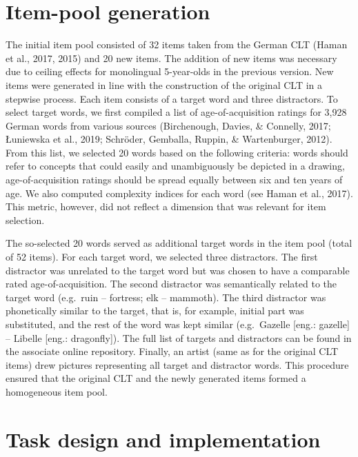 \documentclass[
  man,floatsintext]{apa6}
\begin{document}
\hypertarget{item-pool-generation}{%
\section{Item-pool generation}\label{item-pool-generation}}

The initial item pool consisted of 32 items taken from the German CLT (Haman et al., 2017, 2015) and 20 new items. The addition of new items was necessary due to ceiling effects for monolingual 5-year-olds in the previous version. New items were generated in line with the construction of the original CLT in a stepwise process. Each item consists of a target word and three distractors. To select target words, we first compiled a list of age-of-acquisition ratings for 3,928 German words from various sources (Birchenough, Davies, \& Connelly, 2017; Łuniewska et al., 2019; Schröder, Gemballa, Ruppin, \& Wartenburger, 2012). From this list, we selected 20 words based on the following criteria: words should refer to concepts that could easily and unambiguously be depicted in a drawing, age-of-acquisition ratings should be spread equally between six and ten years of age. We also computed complexity indices for each word (see Haman et al., 2017). This metric, however, did not reflect a dimension that was relevant for item selection.

The so-selected 20 words served as additional target words in the item pool (total of 52 items). For each target word, we selected three distractors. The first distractor was unrelated to the target word but was chosen to have a comparable rated age-of-acquisition. The second distractor was semantically related to the target word (e.g.~ruin -- fortress; elk -- mammoth). The third distractor was phonetically similar to the target, that is, for example, initial part was substituted, and the rest of the word was kept similar (e.g.~Gazelle {[}eng.: gazelle{]} -- Libelle {[}eng.: dragonfly{]}). The full list of targets and distractors can be found in the associate online repository. Finally, an artist (same as for the original CLT items) drew pictures representing all target and distractor words. This procedure ensured that the original CLT and the newly generated items formed a homogeneous item pool.

\hypertarget{task-design-and-implementation}{%
\section{Task design and implementation}\label{task-design-and-implementation}}
\end{document}
